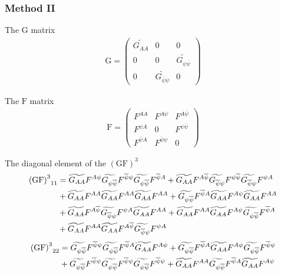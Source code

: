 \documentclass[UTF8]{ctexart}
\begin{document}
\subsubsection{Method II}
\par The $\mathrm{G}$ matrix
\begin{gather}
\mathrm{G}=\begin{pmatrix}\widetilde{G_{AA}}&0&0\\0&0&\widetilde{G_{\psi\overline{\psi}}}\\0&{\widetilde{G_{\overline{\psi}\psi}}}&0\end{pmatrix}
\end{gather}
\par The $\mathrm{F}$ matrix
\begin{gather}
\mathrm{F}=\begin{pmatrix}F^{AA}&F^{A\psi}&F^{A\overline{\psi}}\\F^{\psi A}&0&F^{\psi\overline{\psi}}\\F^{\overline{\psi}A}&F^{\overline{\psi}\psi}&0\end{pmatrix}
\end{gather}
\par The diagonal element of the $\mathrm{{(GF)}^{3}}$
\begin{align}
\mathrm{{(GF)}^3}_{11}
&=\widetilde{G_{AA}}F^{A\psi}\widetilde{G_{\psi\overline{\psi}}}F^{\overline{\psi}\psi}\widetilde{G_{\psi\overline{\psi}}}F^{\overline{\psi}A}+\widetilde{G_{AA}}F^{A\overline{\psi}}\widetilde{G_{\overline{\psi}\psi}}F^{\psi\overline{\psi}}\widetilde{G_{\overline{\psi}\psi}}F^{\psi A}
\notag\\&+\widetilde{G_{AA}}F^{AA}\widetilde{G_{AA}}F^{AA}\widetilde{G_{AA}}F^{AA}+\widetilde{G_{\psi\overline{\psi}}}F^{\overline{\psi}A}\widetilde{G_{AA}}F^{A\psi}\widetilde{G_{AA}}F^{AA}
\notag\\&+\widetilde{G_{AA}}F^{A\overline{\psi}}\widetilde{G_{\overline{\psi}\psi}}F^{\psi A}\widetilde{G_{AA}}F^{AA}+\widetilde{G_{AA}}F^{AA}\widetilde{G_{AA}}F^{A\psi}\widetilde{G_{\psi\overline{\psi}}}F^{\overline{\psi}A}
\notag\\&+\widetilde{G_{AA}}F^{AA}\widetilde{G_{AA}}F^{A\overline{\psi}}\widetilde{G_{\overline{\psi}\psi}}F^{\psi A}
\end{align}
\begin{align}
\mathrm{{(GF)}^3}_{22}
&=\widetilde{G_{\psi\overline{\psi}}}F^{\overline{\psi}\psi}\widetilde{G_{\psi\overline{\psi}}}F^{\overline{\psi}A}\widetilde{G_{AA}}F^{A\psi}+\widetilde{G_{\psi\overline{\psi}}}F^{\overline{\psi}A}\widetilde{G_{AA}}F^{A\psi}\widetilde{G_{\psi\overline{\psi}}}F^{\overline{\psi}\psi}
\notag\\&+\widetilde{G_{\psi\overline{\psi}}}F^{\overline{\psi}\psi}\widetilde{G_{\psi\overline{\psi}}}F^{\overline{\psi}\psi}\widetilde{G_{\psi\overline{\psi}}}F^{\overline{\psi}\psi}+\widetilde{G_{AA}}F^{AA}\widetilde{G_{\psi\overline{\psi}}}F^{\overline{\psi}A}\widetilde{G_{AA}}F^{A\psi}
\end{align}
\end{document}
